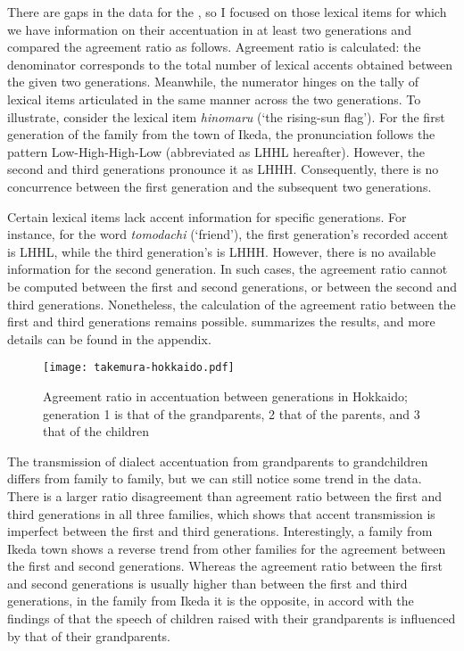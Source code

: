 \documentclass[output=paper,colorlinks,citecolor=brown]{langscibook}
\begin{document}
There are gaps in the data for the \citet{NLRI1965}, so I focused on those lexical items for which we have information on their accentuation in at least two generations and compared the agreement ratio as follows. Agreement ratio is calculated: the denominator corresponds to the total number of lexical accents obtained between the given two generations. Meanwhile, the numerator hinges on the tally of lexical items articulated in the same manner across the two generations. To illustrate, consider the lexical item \emph{hinomaru} (`the rising-sun flag'). For the first generation of the family from the town of Ikeda, the pronunciation follows the pattern Low-High-High-Low (abbreviated as LHHL hereafter). However, the second and third generations pronounce it as LHHH. Consequently, there is no concurrence between the first generation and the subsequent two generations.

Certain lexical items lack accent information for specific generations.
For instance, for the word \emph{tomodachi} (`friend'), the first generation's recorded accent is LHHL, while the third generation's is LHHH. However, there is no available information for the second generation. In such cases, the agreement ratio cannot be computed between the first and second generations, or between the second and third generations. Nonetheless, the calculation of the agreement ratio between the first and third generations remains possible.  summarizes the results, and more details can be found in the appendix.

\begin{figure}
\texttt{[image: takemura-hokkaido.pdf]}
\caption{Agreement ratio in accentuation between generations in Hokkaido; generation 1 is that of the grandparents, 2 that of the parents, and 3 that of the children}
\label{fig:hokkaido}
\end{figure}

The transmission of dialect accentuation from grandparents to grandchildren differs from family to family, but we can still notice some trend in the data. There is a larger ratio disagreement than agreement ratio between the first and third generations in all three families, which shows that accent transmission is imperfect between the first and third generations. Interestingly, a family from Ikeda town shows a reverse trend from other families for the agreement between the first and second generations. Whereas the agreement ratio between the first and second generations is usually higher than between the first and third generations, in the family from Ikeda it is the opposite, in accord with the findings of \citet{InoueHanzawa2022} that the speech of children raised with their grandparents is influenced by that of their grandparents.
\end{document}
